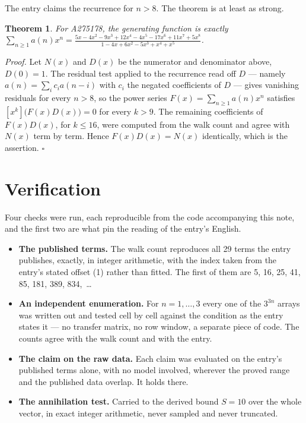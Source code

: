 \documentclass[11pt]{article}
\newtheorem{theorem}{Theorem}
\theoremstyle{definition}
\begin{document}
The entry claims the recurrence for $n > 8$. The theorem is at least as strong.

\begin{theorem} For A275178, the generating function is exactly $\sum_{n\ge 1} a(n)x^n = \frac{5x - 4x^{2} - 9x^{3} + 12x^{4} - 4x^{5} - 17x^{6} + 11x^{7} + 5x^{8}}{1 - 4x + 6x^{2} - 5x^{3} + x^{4} + x^{5}}$.\end{theorem}

{\itshape Proof.} Let $N(x)$ and $D(x)$ be the numerator and denominator above, $D(0)=1$. The residual test applied to the recurrence read off $D$ --- namely $a(n) = \sum_i c_i a(n-i)$ with $c_i$ the negated coefficients of $D$ --- gives vanishing residuals for every $n > 8$, so the power series $F(x)=\sum_{n\ge 1}a(n)x^n$ satisfies $[x^k]\bigl(F(x)D(x)\bigr) = 0$ for every $k > 9$. The remaining coefficients of $F(x)D(x)$, for $k \le 16$, were computed from the walk count and agree with $N(x)$ term by term. Hence $F(x)D(x) = N(x)$ identically, which is the assertion. $\square$

\section{Verification}

Four checks were run, each reproducible from the code accompanying this note, and the first two are what pin the reading of the entry's English.

\begin{itemize}

\item {\bfseries The published terms.} The walk count reproduces all 29 terms the entry publishes, exactly, in integer arithmetic, with the index taken from the entry's stated offset (1) rather than fitted. The first of them are 5, 16, 25, 41, 85, 181, 389, 834,~\dots

\item {\bfseries An independent enumeration.} For $n = 1,\dots,3$ every one of the $3^{3n}$ arrays was written out and tested cell by cell against the condition as the entry states it --- no transfer matrix, no row window, a separate piece of code. The counts agree with the walk count and with the entry.

\item {\bfseries The claim on the raw data.} Each claim was evaluated on the entry's published terms alone, with no model involved, wherever the proved range and the published data overlap. It holds there.

\item {\bfseries The annihilation test.} Carried to the derived bound $S = 10$ over the whole vector, in exact integer arithmetic, never sampled and never truncated.

\end{itemize}
\end{document}

